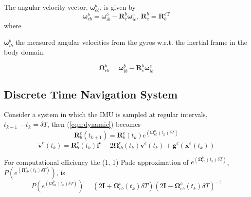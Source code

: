 \documentclass[a4paper]{report}
\numberwithin{equation}{chapter}
\newcommand{\mat}[1]{\boldsymbol{#1}}
\begin{document}
The angular velocity vector, $\mat{\omega}^b_{eb}$, is given by
\begin{equation}
\mat{\omega}^b_{eb} = \mat{\omega}^b_{ib} - \mat{R}^b_e \mat{\omega}^e_{ie}
\text{, }
\mat{R}^b_e = \mat{R}^{e\mathrm{T}}_b
\end{equation}
where

  $\mat{\omega}^b_{ib}$ the measured angular velocities from the gyros w.r.t. the inertial frame in the body domain.

\begin{equation}
\mat{\Omega}^b_{eb} = \mat{\omega}^b_{ib} - \mat{R}^b_e \mat{\omega}^e_{ie}
\end{equation}

\subsection[Discrete Time Navigation System]{Discrete Time Navigation System}

Consider a system in which the IMU is sampled at regular intervals, $t_{k+1} - t_k = \delta{T}$, then (\ref{eqn:dynamic}) becomes
\begin{equation}
\mat{R}^e_b \left( t_{k + 1} \right) = \mat{R}^e_b \left( t_k \right) e^{\left( \mat{\Omega}^b_{eb} \left( t_k \right) \delta{T} \right)}
\end{equation}
\begin{equation}
\dot{\mat{v}}^e \left( t_k \right) = \mat{R}^e_b \left( t_k \right) \mat{f}^b - 2 \mat{\Omega}^e_{ib} \left( t_k \right) \mat{v}^e \left( t_k \right) + \mat{g}^e \left( \mat{x}^e \left( t_k \right) \right)
\end{equation}

For computational efficiency the (1, 1) Pade approximation of $e^{\left( \mat{\Omega}^b_{eb} \left( t_k \right) \delta{T} \right)}$, $P \left(e^{\left( \mat{\Omega}^b_{eb} \left( t_k \right) \delta{T} \right)} \right)$, is
\begin{equation}
P \left( e^{\left( \mat{\Omega}^b_{eb} \left( t_k \right) \delta{T} \right)} \right) = \left( 2\mat{I} + \mat{\Omega}^b_{eb} \left( t_k \right) \delta{T} \right)\left( 2\mat{I} - \mat{\Omega}^b_{eb} \left( t_k \right) \delta{T} \right)^{-1}
\end{equation}

\bigskip
\end{document}
